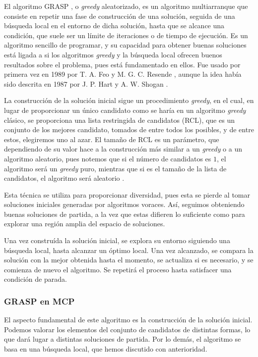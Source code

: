El algoritmo GRASP \citep{feo:1995}, o \textit{greedy} aleatorizado, es un algoritmo
multiarranque que consiste en repetir una fase de construcción de una solución,
seguida de una búsqueda local en el entorno de dicha solución, hasta que se alcance
una condición, que suele ser un límite de iteraciones o de tiempo de ejecución.
Es un algoritmo sencillo de programar, y su capacidad para obtener buenas soluciones
está ligada a si los algoritmos \textit{greedy} y la búsqueda local ofrecen buenos
resultados sobre el problema, pues está fundamentado en ellos. Fue usado por primera
vez en 1989 por T. A. Feo y M. G. C. Resende \citep{feo:1989}, aunque la idea había
sido descrita en 1987 por J. P. Hart y A. W. Shogan \citep{hart:1987}.

La construcción de la solución inicial sigue un procedimiento \textit{greedy}, en el cual,
en lugar de proporcionar un único candidato como se haría en un algoritmo \textit{greedy}
clásico, se proporciona una lista restringida de candidatos (RCL), que es un conjunto
de los mejores candidato, tomados de entre todos los posibles, y de entre estos,
elegiremos uno al azar. El tamaño de RCL es un parámetro, que dependiendo de su valor
hace a la construcción más similar a un \textit{greedy} o a un algoritmo aleatorio,
pues notemos que si el número de candidatos es $1$, el algoritmo será un \textit{greedy}
puro, mientras que si es el tamaño de la lista de candidatos, el algoritmo será aleatorio \citep{herrera:2014}.

Esta técnica se utiliza para proporcionar diversidad, pues esta se pierde al tomar soluciones
iniciales generadas por algoritmos voraces. Así, seguimos obteniendo buenas soluciones de
partida, a la vez que estas difieren lo suficiente como para explorar una región amplia del
espacio de soluciones.

Una vez construída la solución inicial, se explora su entorno siguiendo una búsqueda local,
hasta alcanzar un óptimo local. Una vez alcanzado, se compara la solución con la mejor obtenida
hasta el momento, se actualiza si es necesario, y se comienza de nuevo el algoritmo.
Se repetirá el proceso hasta satisfacer una condición de parada.

\subsubsection{GRASP en MCP}

El aspecto fundamental de este algoritmo es la construcción de la solución inicial.
Podemos valorar los elementos del conjunto de candidatos de distintas formas, lo que
dará lugar a distintas soluciones de partida. Por lo demás, el algoritmo se basa en
una búsqueda local, que hemos discutido con anterioridad.

